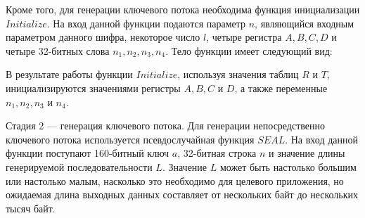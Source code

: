 \documentclass{./civarticle}
\begin{document}
Кроме того, для генерации ключевого потока необходима функция инициализации $Initialize$. На вход данной функции подаются параметр $n$, являющийся входным параметром данного шифра, некоторое число $l$, четыре регистра $A, B, C, D$ и четыре 32-битных слова $n_1, n_2, n_3, n_4$. Тело функции имеет следующий вид:
\begin{figure}[h]
\end{figure}

В результате работы функции $Initialize$, используя значения таблиц $R$ и $T$, инициализируются значениями регистры $A, B, C$ и $D$, а также переменные $n_1, n_2, n_3$ и $n_4$.

Стадия 2 --- генерация ключевого потока.
Для генерации непосредственно ключевого потока используется псевдослучайная функция $SEAL$. На вход данной функции поступают 160-битный ключ $a$, 32-битная строка $n$ и значение длины генерируемой последовательности $L$. Значение $L$ может быть настолько большим или настолько малым, насколько это необходимо для целевого приложения, но ожидаемая длина выходных данных составляет от нескольких байт до нескольких тысяч байт.
\end{document}
